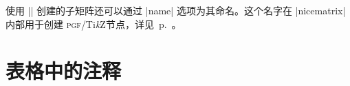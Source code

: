 \documentclass[dvipsnames]{article}%
\def\tikzname{Ti\emph{k}Z}
\begin{document}
\bigskip
使用 |\SubMatrix| 创建的子矩阵还可以通过 |name| 选项为其命名。这个名字在 |nicematrix| 内部用于创建 \textsc{pgf}/\tikzname 节点，详见~p.~\pageref{node-sub-matrix}。
\bigskip
%
%
%

\section{表格中的注释}

\label{s:notes}

\end{document}
